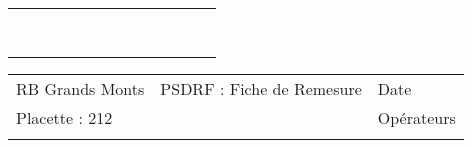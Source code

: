 \documentclass[a4paper, landscape]{article}\usepackage[]{graphicx}\usepackage[]{color}
\begin{document}
{\begin{tabular}{|p{1cm}|p{2cm}|p{1.6cm}|p{1.6cm}|p{1.6cm}|p{1.6cm}|p{1.5cm}|p{1.5cm}|p{1.5cm}|p{1.5cm}|p{1.5cm}|p{7.5cm}|p{5cm}|}
 &  &  &  &  &  &  &  &  &  &  &  &  \\ 
   \hline
 &  &  &  &  &  &  &  &  &  &  &  &  \\ 
   \rowcolor[gray]{0.95} \hline
 &  &  &  &  &  &  &  &  &  &  &  &  \\ 
   \hline
 &  &  &  &  &  &  &  &  &  &  &  &  \\ 
   \rowcolor[gray]{0.95} \hline
 &  &  &  &  &  &  &  &  &  &  &  &  \\ 
   \hline
 &  &  &  &  &  &  &  &  &  &  &  &  \\ 
   \rowcolor[gray]{0.95} \hline
 &  &  &  &  &  &  &  &  &  &  &  &  \\ 
   \hline
 &  &  &  &  &  &  &  &  &  &  &  &  \\ 
   \rowcolor[gray]{0.95} \hline
 &  &  &  &  &  &  &  &  &  &  &  &  \\ 
   \hline
\end{tabular}
}

\begin{tabular}{p{10cm}p{10cm}p{8cm}}
  RB Grands Monts & PSDRF : Fiche de Remesure & Date \\ 
  Placette : 212 &  & Opérateurs \\ 
   &  &  \\ 
  \end{tabular}
\end{document}
